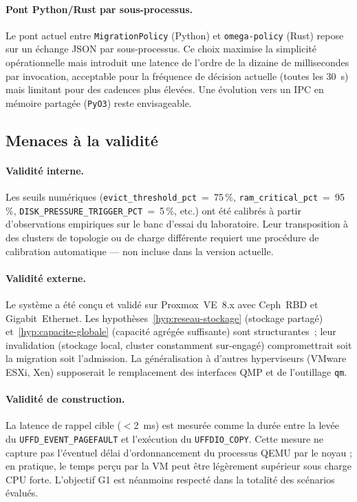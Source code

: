 \paragraph{Pont Python/Rust par sous-processus.}
Le pont actuel entre \texttt{MigrationPolicy} (Python) et \texttt{omega-policy} (Rust) repose sur un échange JSON par sous-processus. Ce choix maximise la simplicité opérationnelle mais introduit une latence de l'ordre de la dizaine de millisecondes par invocation, acceptable pour la fréquence de décision actuelle (toutes les 30~s) mais limitant pour des cadences plus élevées. Une évolution vers un IPC en mémoire partagée (\texttt{PyO3}) reste envisageable.

\subsection{Menaces à la validité}
\label{subsec:menaces-validite}

\paragraph{Validité interne.}
Les seuils numériques (\texttt{evict\_threshold\_pct}~=~75\,\%, \texttt{ram\_critical\_pct}~=~95\,\%, \texttt{DISK\_PRESSURE\_TRIGGER\_PCT}~=~5\,\%, etc.) ont été calibrés à partir d'observations empiriques sur le banc d'essai du laboratoire. Leur transposition à des clusters de topologie ou de charge différente requiert une procédure de calibration automatique --- non incluse dans la version actuelle.

\paragraph{Validité externe.}
Le système a été conçu et validé sur Proxmox~VE~8.x avec Ceph~RBD et Gigabit~Ethernet. Les hypothèses~\ref{hyp:reseau-stockage} (stockage partagé) et~\ref{hyp:capacite-globale} (capacité agrégée suffisante) sont structurantes~; leur invalidation (stockage local, cluster constamment sur-engagé) compromettrait soit la migration soit l'admission. La généralisation à d'autres hyperviseurs (VMware ESXi, Xen) supposerait le remplacement des interfaces QMP et de l'outillage \texttt{qm}.

\paragraph{Validité de construction.}
La latence de rappel cible ($<$2~ms) est mesurée comme la durée entre la levée du \texttt{UFFD\_EVENT\_PAGEFAULT} et l'exécution du \texttt{UFFDIO\_COPY}. Cette mesure ne capture pas l'éventuel délai d'ordonnancement du processus QEMU par le noyau ; en pratique, le temps perçu par la VM peut être légèrement supérieur sous charge CPU forte. L'objectif G1 est néanmoins respecté dans la totalité des scénarios évalués.

